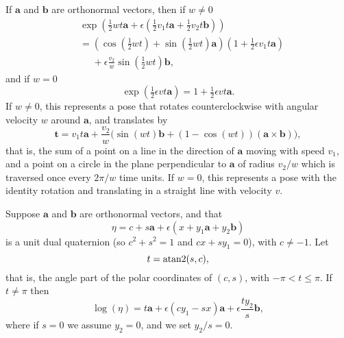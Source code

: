 \documentclass[reqno,12pt]{amsart}
\newtheorem{theorem}{Theorem}
\begin{document}
If $\bm a$ and $\bm b$ are orthonormal vectors, then if $w \ne 0$
\label{exp theta}
\begin{equation}
\begin{aligned}
& \exp\left(\tfrac12wt \bm a + \epsilon(\tfrac12v_1t \bm a + \tfrac12v_2t \bm b)\right) \\
&= \left(\cos(\tfrac12wt) + \sin(\tfrac12wt) \bm a\right) \left(1 + \tfrac12 \epsilon v_1t \bm a \right) \\
&\phantom{{}={}} + \epsilon \frac{v_2}w\sin(\tfrac12 wt) \bm b ,
\end{aligned}
\end{equation}
and if $w = 0$
\begin{equation}
\exp\left(\tfrac12 \epsilon vt \bm a\right) = 1 + \tfrac12 \epsilon v t \bm a .
\end{equation}
If $w \ne 0$, this represents a pose that rotates counterclockwise with angular velocity $w$ around $\bm a$, and translates by
\begin{equation}
\bm t = v_1 t \bm a + \frac {v_2}w\bigl(\sin(wt)  \bm b + (1-\cos(wt)) (\bm a \times \bm b) \bigr) ,
\end{equation}
that is, the sum of a point on a line in the direction of $\bm a$ moving with speed $v_1$, and a point on a circle in the plane perpendicular to $\bm a$ of radius $v_2/w$ which is traversed once every $2\pi/w$ time units.  If $w = 0$, this represents a pose with the identity rotation and translating in a straight line with velocity $v$.

Suppose $\bm a$ and $\bm b$ are orthonormal vectors, and that
\begin{equation}
\label{eta for log}
\eta = c + s \bm a + \epsilon (x + y_1 \bm a + y_2 \bm b)
\end{equation}
is a unit dual quaternion (so $c^2 + s^2 = 1$ and $cx + sy_1 = 0$), with $c \ne -1$.  Let
\begin{equation}
t = \text{\rm atan2}(s,c),
\end{equation}
that is, the angle part of the polar coordinates of $(c,s)$, with $-\pi < t \le \pi$.  If $t \ne \pi$ then
\begin{equation}
\log(\eta) = t \bm a + \epsilon (c y_1 - s x ) \bm a
+ \epsilon \frac{t y_2}{s} \bm b,
\end{equation}
where if $s = 0$ we assume $y_2 = 0$, and we set $y_2/s = 0$.
\end{document}
